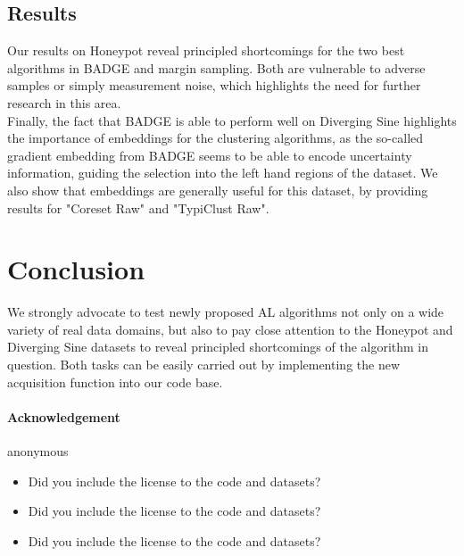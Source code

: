 \documentclass[]{article}
\begin{document}
\subsection{Results}
Our results on Honeypot reveal principled shortcomings for the two best algorithms in BADGE and margin sampling.
Both are vulnerable to adverse samples or simply measurement noise, which highlights the need for further research in this area. \\
Finally, the fact that BADGE is able to perform well on Diverging Sine highlights the importance of embeddings for the clustering algorithms, as the so-called gradient embedding from BADGE seems to be able to encode uncertainty information, guiding the selection into the left hand regions of the dataset. 
We also show that embeddings are generally useful for this dataset, by providing results for "Coreset Raw" and "TypiClust Raw".


\section{Conclusion}
We strongly advocate to test newly proposed AL algorithms not only on a wide variety of real data domains, but also to pay close attention to the Honeypot and Diverging Sine datasets to reveal principled shortcomings of the algorithm in question.
Both tasks can be easily carried out by implementing the new acquisition function into our code base.


\newpage
\paragraph{Acknowledgement}
anonymous




 
\begin{itemize}
	\item Did you include the license to the code and datasets? 
	\item Did you include the license to the code and datasets? 
	\item Did you include the license to the code and datasets? \answerNA{}
\end{itemize}
\end{document}
